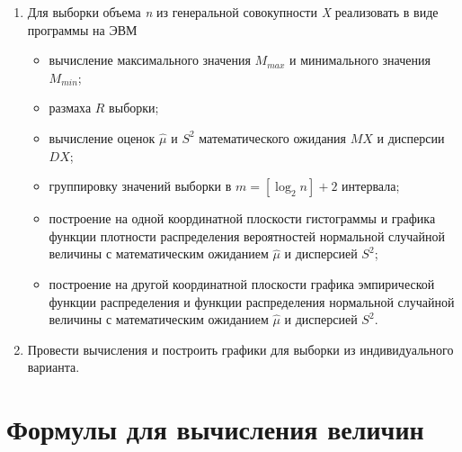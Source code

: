\documentclass[a4paper,14pt, unknownkeysallowed]{extreport}
\begin{document}
\begin{enumerate}
    \item Для выборки объема \textit{n} из генеральной совокупности \textit{X} реализовать в виде программы на ЭВМ

    \begin{itemize}
        \item вычисление максимального значения $M_{max}$ и минимального значения $M_{min}$;
        \item размаха $R$ выборки;
        \item вычисление оценок $\hat\mu$ и $S^2$ математического ожидания $MX$ и дисперсии $DX$;
        \item группировку значений выборки в $m = [\log_2 n] + 2$ интервала;
        \item построение на одной координатной плоскости гистограммы и графика функции плотности распределения вероятностей нормальной случайной величины с математическим ожиданием $\hat{\mu}$ и дисперсией $S^2$;
        \item построение на другой координатной плоскости графика эмпирической функции распределения и функции распределения нормальной случайной величины с математическим ожиданием $\hat{\mu}$ и дисперсией $S^2$.
    \end{itemize}

    \item Провести вычисления и построить графики для выборки из индивидуального варианта.
\end{enumerate}

\chapter{Формулы для вычисления величин}
\end{document}

